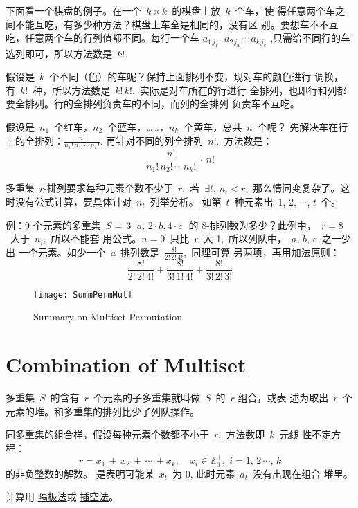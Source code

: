 下面看一个棋盘的例子。在一个~$k \times k$~的棋盘上放~$k$~个车，使
得任意两个车之间不能互吃，有多少种方法？棋盘上车全是相同的，没有区
别。要想车不不互吃，任意两个车的行列值都不同。每行一个车
$a_{1\,j_1},\, a_{2\,j_2}\, \cdots\, a_{k\,j_k}$
,只需给不同行的车选列即可，所以方法数是~$k!$.

假设是~$k$~个不同（色）的车呢？保持上面排列不变，现对车的颜色进行
调换，有~$k!$~种，所以方法数是~$k! \, k!$.~实际是对车所在的行进行
全排列，也即行和列都要全排列。行的全排列负责车的不同，而列的全排列
负责车不互吃。

假设是~$n_1$~个红车，$n_2$~个蓝车，……，$n_k$~个黄车，总共~$n$~个呢？
先解决车在行上的全排列：$\frac{n!}{n_1!\, n_2!\, \cdots\, n_k!}$.
再针对不同的列全排列~$n!$.~方法数是：
\[ \frac{n!}{n_1!\, n_2!\, \cdots\, n_k!}\, \cdot\, n! \]

多重集~$r$-排列要求每种元素个数不少于~$r$,~若~$\exists t,\, n_t <
r$,~那么情问变复杂了。这时没有公式计算，要具体针对~$n_t$~列举分析。
如第~$t$~种元素出~$1,\, 2,\, \cdots,\, t$~个。

例：9 个元素的多重集~$S = {\, 3 \cdot a,\, 2 \cdot b, 4 \cdot c
  \,}$~的 8-排列数为多少？此例中，~$r = 8$~大于~$n_i$,~所以不能套
用公式。$n = 9$~只比~$r$~大 1,~所以列队中，~$a,\, b,\, c$~之一少出
一个元素。如少一个~$a$~排列数是~$\frac{8!}{2!\,2!\,4!}$,~同理可算
另两项，再用加法原则：
\[ \frac{8!}{2!\,2!\,4!} + \frac{8!}{3!\,1!\,4!} +
  \frac{8!}{3!\,2!\,3!} \]

\begin{figure}[!htb]
  \centering
  \texttt{[image: SummPermMul]}
  \caption{Summary on Multiset Permutation}
\end{figure}

\section{Combination of Multiset}
\label{sec:combination-multiset}

多重集~$S$~的含有~$r$~个元素的子多重集就叫做~$S$~的~$r$-组合，或表
述为取出~$r$~个元素的堆。和多重集的排列比少了列队操作。

同多重集的组合样，假设每种元素个数都不小于~$r$.~方法数即~$k$~元线
性不定方程：
\[ r = x_1\, +\, x_2\, +\, \cdots\, + x_k,\quad x_i \in
  \mathbb{Z}_0^+,\; i = 1,\, 2\, \cdots,\, k \] 的非负整数的解数。
是表明可能某~$x_t$~为 0, 此时元素~$a_t$~没有出现在组合
堆里。

计算用
\href{https://zh.wikipedia.org/zh-cn/\%E9\%9A\%94\%E6\%9D\%BF\%E6\%B3\%95}{
  隔板法}或
\href{https://zh.wikipedia.org/wiki/\%E6\%8F\%92\%E7\%A9\%BA\%E6\%B3\%95}{
  插空法}。

